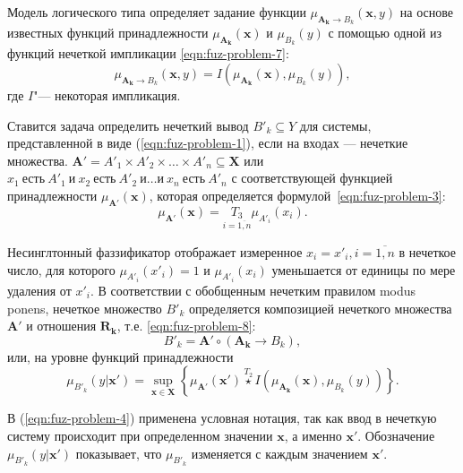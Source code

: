 Модель логического типа определяет задание функции $\mu_{\mathbf{A_k} \to B_k} (\mathbf{x}, y)$ на основе известных функций принадлежности $\mu_{\mathbf{A_k}}(\mathbf{x})$ и $\mu_{B_k}(y)$ с помощью одной из функций нечеткой импликации \eqref{eqn:fuz-problem-7}:
\begin{equation}
	\label{eqn:fuz-problem-7}
	\mu_{\mathbf{A_k} \to B_k} (\mathbf{x}, y) = I(\mu_{\mathbf{A_k}}(\mathbf{x}), \mu_{B_k}(y)),
\end{equation}
где $I$"--- некоторая импликация.

Ставится задача определить нечеткий вывод $B'_k \subseteq Y$ для системы, представленной в виде (\ref{eqn:fuz-problem-1}), если на входах --- нечеткие множества.
$\mathbf{A'}=A'_1 \times A'_2 \times \dots \times A'_n \subseteq \mathbf{X}$ или $x_1\ \text{есть}\ A'_1\ \text{и}\ x_2\ \text{есть}\ A'_2\ \text{и} \dots \text{и}\ x_n\ \text{есть}\ A'_n$ с соответствующей функцией принадлежности $\mu_{\mathbf{A'}}(\mathbf{x})$, которая определяется формулой~\eqref{eqn:fuz-problem-3}:
\begin{equation}
	\label{eqn:fuz-problem-3}
	\mu_{\mathbf{A'}}(\mathbf{x}) = \underset{i=\overline{1,n}}{T_3} \mu_{A'_i}(x_i).
\end{equation}

Несинглтонный фаззификатор отображает измеренное $x_i=x'_i, i=\overline{1,n}$ в нечеткое число, для которого $\mu_{A'_i}(x'_i) = 1$ и $\mu_{A'_i}(x_i)$ уменьшается от единицы по мере удаления от  $x'_i$.
В соответствии с обобщенным нечетким правилом modus ponens, нечеткое множество $B'_k$ определяется композицией нечеткого множества $\mathbf{A'}$ и отношения $\mathbf{R_k}$, т.е. \eqref{eqn:fuz-problem-8}:
\begin{equation}
	\label{eqn:fuz-problem-8}
B'_k = \mathbf{A'} \circ (\mathbf{A_k} \to B_k),
\end{equation}
или, на уровне функций принадлежности
\begin{equation}
	\label{eqn:fuz-problem-4}
	\mu_{B'_k}(y|\mathbf{x'}) = \sup_{\mathbf{x}\in \mathbf{X}}\left\{\mu_{\mathbf{A'}}(\mathbf{x'})\overset{T_2}{\star} I(\mu_{\mathbf{A_k}}(\mathbf{x}), \mu_{B_k}(y))\right\}.
\end{equation}

В (\ref{eqn:fuz-problem-4}) применена условная нотация, так как ввод в нечеткую систему происходит при определенном значении $\mathbf{x}$, а именно $\mathbf{x'}$. Обозначение $\mu_{B'_k}(y | \mathbf{x'})$ показывает, что $\mu_{B'_k}$ изменяется с каждым значением $\mathbf{x'}$.

